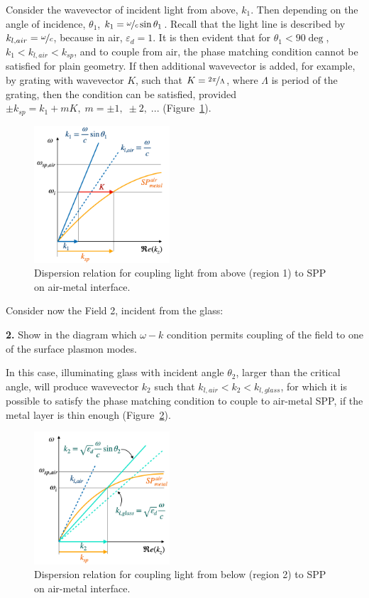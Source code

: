 \documentclass[11pt,a4paper]{article}
\begin{document}
Consider the wavevector of incident light from above, $k_1$. Then depending on the angle of incidence, $\theta_1$, $k_1 = \nicefrac{\omega}{c} \sin{\theta_1}$. Recall that the light line is described by $k_{l,air}=\nicefrac{\omega}{c}$, because in air, $\varepsilon_d=1$. It is then evident that for $\theta_1 < 90 \deg$, $k_1 < k_{l,air} < k_{sp}$, and to couple from air, the phase matching condition cannot be satisfied for plain geometry. If then additional wavevector is added, for example, by grating with wavevector $K$, such that $K = \nicefrac{2 \pi}{\Lambda}$, where $\Lambda$ is period of the grating, then the condition can be satisfied, provided $\pm k_{sp} = k_1 + mK, \; m = \pm 1, \; \pm 2, \; ...$ (Figure~\ref{fig:cond1}).


\begin{figure}[ht]
   \centering
    \includegraphics[width=0.45\textwidth]{cond1.png}
    \caption{Dispersion relation for coupling light from above (region 1) to SPP on air-metal interface.}
    \label{fig:cond1}
\end{figure}

Consider now the Field 2, incident from the glass:
\begin{displayquote}
    \textbf{2.} Show in the diagram which $\omega - k$ condition permits coupling of the field to one of the surface plasmon modes.
\end{displayquote}
In this case, illuminating glass with incident angle $\theta_2$, larger than the critical angle, will produce wavevector $k_2$ such that $k_{l,air} < k_2 < k_{l,glass}$, for which it is possible to satisfy the phase matching condition to couple to air-metal SPP, if the metal layer is thin enough (Figure~\ref{fig:cond2}). 

\begin{figure}[ht]
   \centering
    \includegraphics[width=0.45\textwidth]{cond2.png}
    \caption{Dispersion relation for coupling light from below (region 2) to SPP on air-metal interface.}
    \label{fig:cond2}
\end{figure}
\end{document}
